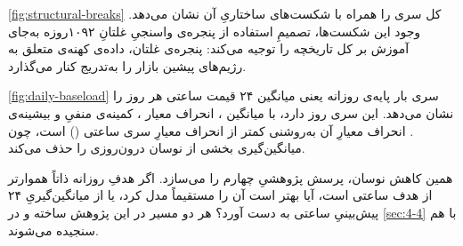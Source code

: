 \cref{fig:structural-breaks} کل سری را همراه با شکست‌های ساختاریِ آن نشان می‌دهد. وجود این شکست‌ها،
تصمیمِ استفاده از پنجره‌ی واسنجیِ غلتانِ ۱۰۹۲روزه به‌جای آموزش بر کل تاریخچه را توجیه
می‌کند: پنجره‌ی غلتان، داده‌ی کهنه‌ی متعلق به رژیم‌های پیشین بازار را به‌تدریج کنار
می‌گذارد.

\cref{fig:daily-baseload} سری بار پایه‌ی روزانه  یعنی میانگین ۲۴ قیمت ساعتی هر روز  را نشان
می‌دهد. این سری  روز دارد، با میانگین ، انحراف معیار ، کمینه‌ی منفیِ
 و بیشینه‌ی . انحراف معیارِ آن به‌روشنی کمتر از انحراف معیارِ سری ساعتی
() است، چون میانگین‌گیری بخشی از نوسان درون‌روزی را حذف می‌کند.

همین کاهش نوسان، پرسش پژوهشیِ چهارم را می‌سازد. اگر هدفِ روزانه ذاتاً هموارتر از
هدف ساعتی است، آیا بهتر است آن را مستقیماً مدل کرد، یا از میانگین‌گیریِ ۲۴ پیش‌بینیِ
ساعتی به دست آورد؟ هر دو مسیر در این پژوهش ساخته و در \cref{sec:4-4} با هم سنجیده می‌شوند.

